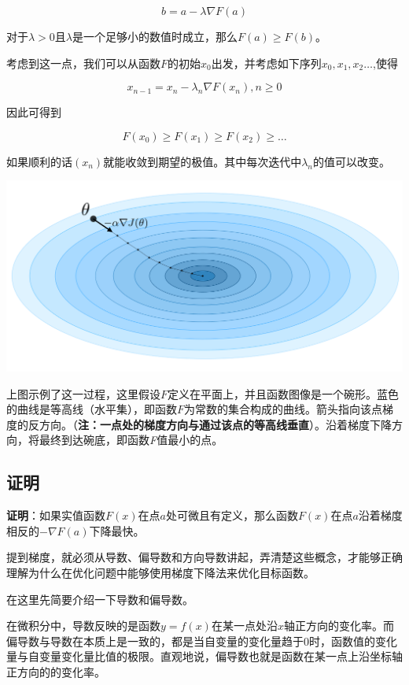 \documentclass[]{book}
\begin{document}
\[
b=a-\lambda \nabla F(a)
\]

对于\(\lambda >0\)且\(\lambda\)是一个足够小的数值时成立，那么\(F(a)\ge F(b)\)。

考虑到这一点，我们可以从函数\(F\)的初始\(x_0\)出发，并考虑如下序列\(x_0,x_1,x_2…\),使得

\[
x_{n-1} = x_n-\lambda_n \nabla F(x_n),n \ge0
\]

因此可得到

\[
F(x_0) \ge F(x_1) \ge F(x_2) \ge \dots
\]

如果顺利的话\((x_n)\)就能收敛到期望的极值。其中每次迭代中\(\lambda_n\)的值可以改变。

\includegraphics{./image/gradient-descent.png}

上图示例了这一过程，这里假设\(F\)定义在平面上，并且函数图像是一个碗形。蓝色的曲线是等高线（水平集），即函数\(F\)为常数的集合构成的曲线。箭头指向该点梯度的反方向。（\textbf{注：一点处的梯度方向与通过该点的等高线垂直}）。沿着梯度下降方向，将最终到达碗底，即函数\emph{F}值最小的点。

\hypertarget{section-4}{%
\subsection{证明}\label{section-4}}

\textbf{证明}：如果实值函数\(F(x)\)在点\(a\)处可微且有定义，那么函数\(F(x)\)在点\(a\)沿着梯度相反的\(- \nabla F(a)\)下降最快。

提到梯度，就必须从导数、偏导数和方向导数讲起，弄清楚这些概念，才能够正确理解为什么在优化问题中能够使用梯度下降法来优化目标函数。

在这里先简要介绍一下导数和偏导数。

在微积分中，导数反映的是函数\(y = f(x)\)在某一点处沿\(x\)轴正方向的变化率。而偏导数与导数在本质上是一致的，都是当自变量的变化量趋于0时，函数值的变化量与自变量变化量比值的极限。直观地说，偏导数也就是函数在某一点上沿坐标轴正方向的的变化率。
\end{document}
